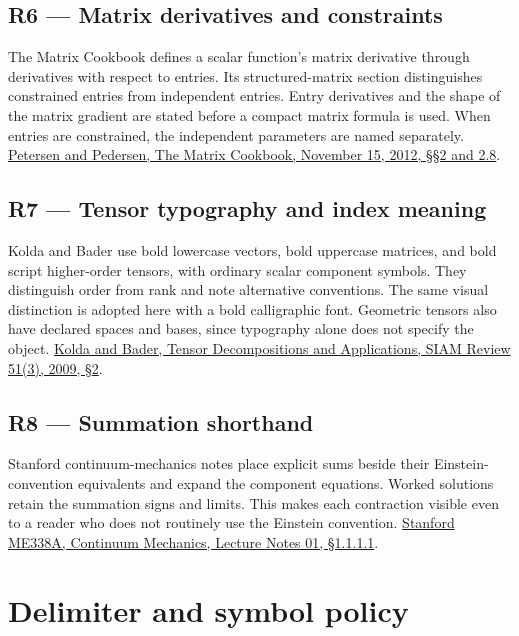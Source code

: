 \documentclass[11pt,oneside,openany]{book}
\begin{document}
\subsection{R6 --- Matrix derivatives and constraints}

The Matrix Cookbook defines a scalar function's matrix derivative through derivatives with respect to entries. Its structured-matrix section distinguishes constrained entries from independent entries. Entry derivatives and the shape of the matrix gradient are stated before a compact matrix formula is used. When entries are constrained, the independent parameters are named separately. \href{https://math.uwaterloo.ca/~hwolkowi/matrixcookbook}{Petersen and Pedersen, The Matrix Cookbook, November 15, 2012, §§2 and 2.8}.

\subsection{R7 --- Tensor typography and index meaning}

Kolda and Bader use bold lowercase vectors, bold uppercase matrices, and bold script higher-order tensors, with ordinary scalar component symbols. They distinguish order from rank and note alternative conventions. The same visual distinction is adopted here with a bold calligraphic font. Geometric tensors also have declared spaces and bases, since typography alone does not specify the object. \href{https://www.kolda.net/publication/TensorReview.pdf}{Kolda and Bader, Tensor Decompositions and Applications, SIAM Review 51(3), 2009, §2}.

\subsection{R8 --- Summation shorthand}

Stanford continuum-mechanics notes place explicit sums beside their Einstein-convention equivalents and expand the component equations. Worked solutions retain the summation signs and limits. This makes each contraction visible even to a reader who does not routinely use the Einstein convention. \href{https://biomechanics.stanford.edu/me338/me338_n01.pdf}{Stanford ME338A, Continuum Mechanics, Lecture Notes 01, §1.1.1.1}.

\section{Delimiter and symbol policy}
\end{document}
